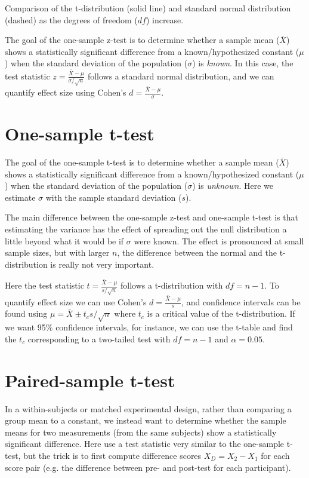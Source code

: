 \documentclass{tufte-handout}
\begin{document}
\begin{marginfigure}
  \label{fig:fullfig}%
  \caption{Comparison of the t-distribution (solid line) and standard normal distribution (dashed) as the degrees of freedom ($df$) increase.}
\end{marginfigure}

The goal of the one-sample z-test is to determine whether a sample mean ($\bar{X}$) shows a statistically significant difference from a known/hypothesized constant ($\mu$) when the standard deviation of the population ($\sigma$) is \emph{known}. In this case, the test statistic $z=\frac{\bar{X}-\mu}{\sigma/\sqrt{n}}$  follows a standard normal distribution, and we can quantify effect size using Cohen's $d=\frac{\bar{X}-\mu}{\sigma}$.


\section{One-sample t-test}

The goal of the one-sample t-test is to determine whether a sample mean ($\bar{X}$) shows a statistically significant difference from a known/hypothesized constant ($\mu$) when the standard deviation of the population ($\sigma$) is \emph{unknown}. Here we estimate $\sigma$ with the sample standard deviation ($s$).

The main difference between the one-sample z-test and one-sample t-test is that estimating the variance has the effect of spreading out the null distribution a little beyond what it would be if $\sigma$ were known. The effect is pronounced at small sample sizes, but with larger $n$, the difference between the normal and the t-distribution is really not very important.

Here the test statistic $t=\frac{\bar{X}-\mu}{s/\sqrt{n}}$ follows a t-distribution with $df=n-1$. To quantify effect size we can use Cohen's $d=\frac{\bar{X}-\mu}{s}$, and confidence intervals can be found using $\mu=\bar{X}\pm t_cs/\sqrt{n}$  where $t_c$  is a critical value of the t-distribution. If we want 95$\%$ confidence intervals, for instance, we can use the t-table and find the $t_c$ corresponding to a two-tailed test with $df=n-1$  and $\alpha=0.05$.

\section{Paired-sample t-test}
In a within-subjects or matched experimental design, rather than comparing a group mean to a constant, we instead want to determine whether the sample means for two measurements (from the same subjects) show a statistically significant difference. Here use a test statistic very similar to the one-sample t-test, but the trick is to first compute difference scores $X_D=X_2-X_1$  for each score pair (e.g. the difference between pre- and post-test for each participant).
\end{document}
